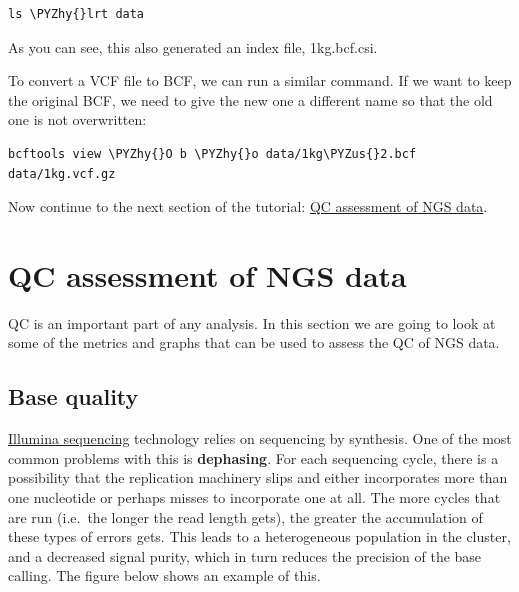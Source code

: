 \documentclass[11pt]{article}
\makeatletter
\def\PYZus{\char`\_}
\def\PYZhy{\char`\-}
\newcommand{\boxspacing}{\kern\kvtcb@left@rule\kern\kvtcb@boxsep}
\newcommand{\prompt}[4]{
        \ttfamily\llap{{\color{#2}\LARGE\faKeyboardO\hspace{3pt}#4}}\vspace{-\baselineskip}
    }
\makeatother
\begin{document}
    \begin{tcolorbox}[breakable, size=fbox, boxrule=1pt, pad at break*=1mm,colback=cellbackground, colframe=cellborder]
\prompt{In}{incolor}{ }{\boxspacing}
\begin{Verbatim}[commandchars=\\\{\}]
ls \PYZhy{}lrt data
\end{Verbatim}
\end{tcolorbox}

    As you can see, this also generated an index file, 1kg.bcf.csi.

    To convert a VCF file to BCF, we can run a similar command. If we want
to keep the original BCF, we need to give the new one a different name
so that the old one is not overwritten:

    \begin{tcolorbox}[breakable, size=fbox, boxrule=1pt, pad at break*=1mm,colback=cellbackground, colframe=cellborder]
\prompt{In}{incolor}{ }{\boxspacing}
\begin{Verbatim}[commandchars=\\\{\}]
bcftools view \PYZhy{}O b \PYZhy{}o data/1kg\PYZus{}2.bcf data/1kg.vcf.gz
\end{Verbatim}
\end{tcolorbox}

    Now continue to the next section of the tutorial:
\href{assessment.ipynb}{QC assessment of NGS data}.





\newpage





    \hypertarget{qc-assessment-of-ngs-data}{%
\section{QC assessment of NGS data}\label{qc-assessment-of-ngs-data}}

QC is an important part of any analysis. In this section we are going to
look at some of the metrics and graphs that can be used to assess the QC
of NGS data.

\hypertarget{base-quality}{%
\subsection{Base quality}\label{base-quality}}

\href{https://en.wikipedia.org/wiki/Illumina_dye_sequencing}{Illumina
sequencing} technology relies on sequencing by synthesis. One of the
most common problems with this is \textbf{dephasing}. For each
sequencing cycle, there is a possibility that the replication machinery
slips and either incorporates more than one nucleotide or perhaps misses
to incorporate one at all. The more cycles that are run (i.e.~the longer
the read length gets), the greater the accumulation of these types of
errors gets. This leads to a heterogeneous population in the cluster,
and a decreased signal purity, which in turn reduces the precision of
the base calling. The figure below shows an example of this.
\end{document}
